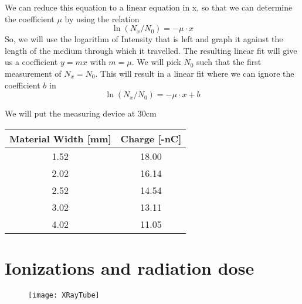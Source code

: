 \documentclass[]{scrartcl}
\begin{document}
We can reduce this equation to a linear equation in x, so that we can determine the coefficient $\mu$ by using the relation
\begin{equation}
	\ln(N_x/N_0) = -\mu\cdot x
\end{equation}
So, we will use the logarithm of Intensity that is left and graph it against the length of the medium through which it travelled. The resulting linear fit will give us a coefficient $y = mx$ with $m=\mu$. We will pick $N_0$ such that the first measurement of $N_x = N_0$. This will result in a linear fit where we can ignore the coefficient $b$ in
\begin{equation}
	\ln(N_x/N_0) = -\mu\cdot x + b
\end{equation}

We will put the measuring device at 30cm
\begin{center}
\begin{tabular}{|c|c|}
\hline
	Material Width [mm] & Charge [-nC]\\
	\hline
1.52 &  18.00\\
2.02 &  16.14\\
2.52 &  14.54\\
3.02 &  13.11\\
4.02 &  11.05\\
\hline
\end{tabular}
\end{center}


\section{Ionizations and radiation dose}

\begin{figure}
	\texttt{[image: XRayTube]}
\end{figure}
\end{document}
